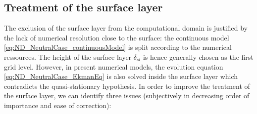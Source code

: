 \subsection{Treatment of the surface layer}
\label{sec:ND_Intro_treatmentSL}
The exclusion of the surface layer from the computational
domain is justified by the lack of numerical resolution
close to the surface: the continuous model
\eqref{eq:ND_NeutralCase_continuousModel} is split
according to the numerical ressources. The height
of the surface layer $\delta_{sl}$ is hence generally chosen as the
first grid level.
However, in present numerical models,
the evolution equation \eqref{eq:ND_NeutralCase_EkmanEq}
is also solved inside the surface layer which contradicts the
quasi-stationary hypothesis.
In order to improve the treatment of the surface layer,
we can identify three issues (subjectively in decreasing
order of importance and ease of correction):
